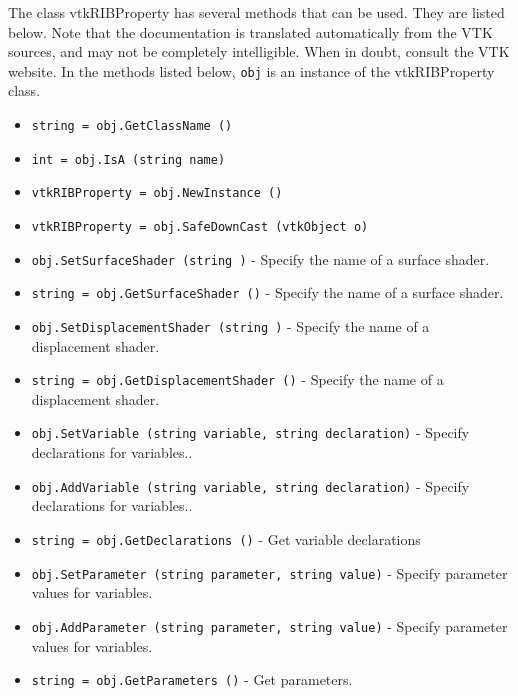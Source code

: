 The class vtkRIBProperty has several methods that can be used.
  They are listed below.
Note that the documentation is translated automatically from the VTK sources,
and may not be completely intelligible.  When in doubt, consult the VTK website.
In the methods listed below, \verb|obj| is an instance of the vtkRIBProperty class.
\begin{itemize}
\item  \verb|string = obj.GetClassName ()|

\item  \verb|int = obj.IsA (string name)|

\item  \verb|vtkRIBProperty = obj.NewInstance ()|

\item  \verb|vtkRIBProperty = obj.SafeDownCast (vtkObject o)|

\item  \verb|obj.SetSurfaceShader (string )| -  Specify the name of a surface shader.

\item  \verb|string = obj.GetSurfaceShader ()| -  Specify the name of a surface shader.

\item  \verb|obj.SetDisplacementShader (string )| -  Specify the name of a displacement shader.

\item  \verb|string = obj.GetDisplacementShader ()| -  Specify the name of a displacement shader.

\item  \verb|obj.SetVariable (string variable, string declaration)| -  Specify declarations for variables..

\item  \verb|obj.AddVariable (string variable, string declaration)| -  Specify declarations for variables..

\item  \verb|string = obj.GetDeclarations ()| -  Get variable declarations

\item  \verb|obj.SetParameter (string parameter, string value)| -  Specify parameter values for variables.

\item  \verb|obj.AddParameter (string parameter, string value)| -  Specify parameter values for variables.

\item  \verb|string = obj.GetParameters ()| -  Get parameters.

\end{itemize}
